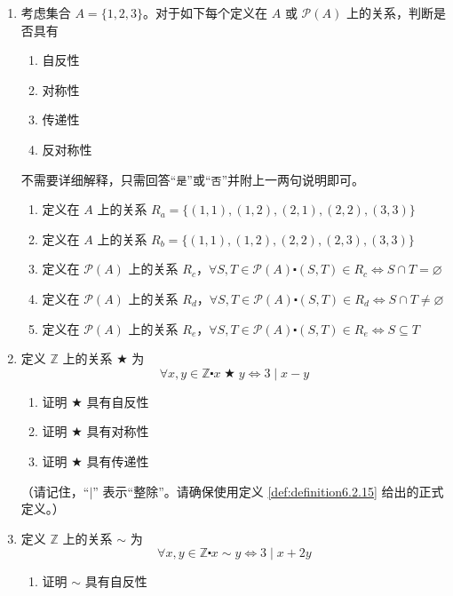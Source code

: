 \begin{enumerate}[label=(\arabic*)]
    \item 考虑集合 $A = \{1, 2, 3\}$。对于如下每个定义在 $A$ 或 $\mathcal{P}(A)$ 上的关系，判断是否具有
    \begin{enumerate}[i]
        \item 自反性
        \item 对称性
        \item 传递性
        \item 反对称性
    \end{enumerate}

    不需要详细解释，只需回答``\verb|是|''或``\verb|否|''并附上一两句说明即可。

    \begin{enumerate}[label=(\alph*)]
        \item 定义在 $A$ 上的关系 $R_a = \{(1, 1),(1, 2),(2, 1),(2, 2),(3, 3)\}$
        \item 定义在 $A$ 上的关系 $R_b = \{(1, 1),(1, 2),(2, 2),(2, 3),(3, 3)\}$
        \item 定义在 $\mathcal{P}(A)$ 上的关系 $R_c$，$\forall S, T \in \mathcal{P}(A) \centerdot (S, T) \in R_c \iff S \cap T = \varnothing$
        \item 定义在 $\mathcal{P}(A)$ 上的关系 $R_d$，$\forall S, T \in \mathcal{P}(A) \centerdot (S, T) \in R_d \iff S \cap T \ne \varnothing$
        \item 定义在 $\mathcal{P}(A)$ 上的关系 $R_e$，$\forall S, T \in \mathcal{P}(A) \centerdot (S, T) \in R_e \iff S \subseteq T$
    \end{enumerate}
    \item 定义 $\mathbb{Z}$ 上的关系 $\bigstar$ 为
    \[\forall x, y \in \mathbb{Z} \centerdot x \;\bigstar\; y \iff 3 \mid x - y\]
    \begin{enumerate}[label=(\alph*)]
        \item 证明 $\bigstar$ 具有自反性
        \item 证明 $\bigstar$ 具有对称性
        \item 证明 $\bigstar$ 具有传递性
    \end{enumerate}
    （请记住，``$\mid$'' 表示``整除''。请确保使用定义 \ref{def:definition6.2.15} 给出的正式定义。）\label{exc:exercises6.2.2}
    \item 定义 $\mathbb{Z}$ 上的关系 $\sim$ 为
    \[\forall x, y \in \mathbb{Z} \centerdot x \sim y \iff 3 \mid x + 2y\]
    \begin{enumerate}[label=(\alph*)]
        \item 证明 $\sim$ 具有自反性

\end{enumerate}
\end{enumerate}
